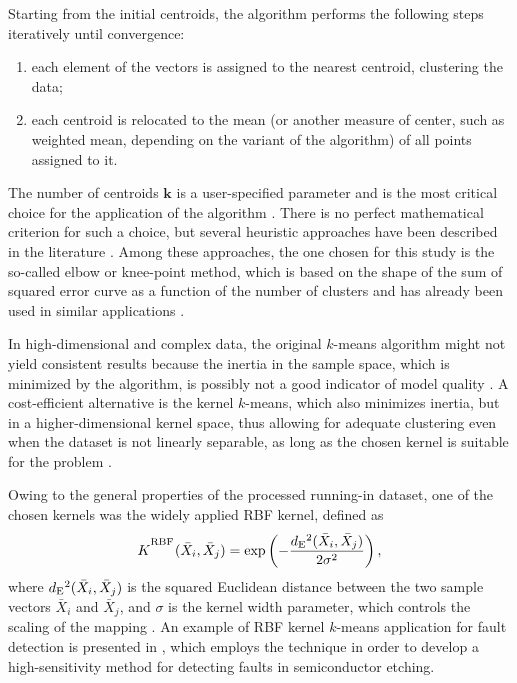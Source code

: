 \documentclass[preprint,11pt,number]{elsarticle}
\begin{document}
Starting from the initial centroids, the algorithm performs the following steps iteratively until convergence:
%
\begin{enumerate}
    \item each element of the vectors is assigned to the nearest centroid, clustering the data;
    \item each centroid is relocated to the mean (or another measure of center, such as weighted mean, depending on the variant of the algorithm) of all points assigned to it.
\end{enumerate}

The number of centroids $\bm{k}$ is a user-specified parameter and is the most critical choice for the application of the algorithm \cite{Jain2010}. There is no perfect mathematical criterion for such a choice, but several heuristic approaches have been described in the literature \cite{Steinley2006,Steinley2011,Hancer2017}. Among these approaches, the one chosen for this study is the so-called elbow or knee-point method, which is based on the shape of the sum of squared error curve as a function of the number of clusters and has already been used in similar applications \cite{Uhlmann2018}.

In high-dimensional and complex data, the original $k$-means algorithm might not yield consistent results because the inertia in the sample space, which is minimized by the algorithm, is possibly not a good indicator of model quality \cite{Li2023}. A cost-efficient alternative is the kernel $k$-means, which also minimizes inertia, but in a higher-dimensional kernel space, thus allowing for adequate clustering even when the dataset is not linearly separable, as long as the chosen kernel is suitable for the problem \cite{Yao2021}.

Owing to the general properties of the processed running-in dataset, one of the chosen kernels was the widely applied RBF kernel, defined as
%
\begin{equation}\label{rbfkernel}
    K^\textsuperscript{RBF}(\bar{X}_i,\bar{X}_j)=\text{exp}\left(-\frac{d\textsubscript{E}^2(\bar{X}_i,\bar{X}_j)}{2\sigma^2}\right),
\end{equation}
%
where $d\textsubscript{E}^2(\bar{X}_i,\bar{X}_j)$ is the squared Euclidean distance between the two sample vectors $\bar{X}_i$ and $\bar{X}_j$, and $\sigma$ is the kernel width parameter, which controls the scaling of the mapping \cite{Wang2007}. An example of RBF kernel $k$-means application for fault detection is presented in \cite{Khediri2012}, which employs the technique in order to develop a high-sensitivity method for detecting faults in semiconductor etching. 
\end{document}
